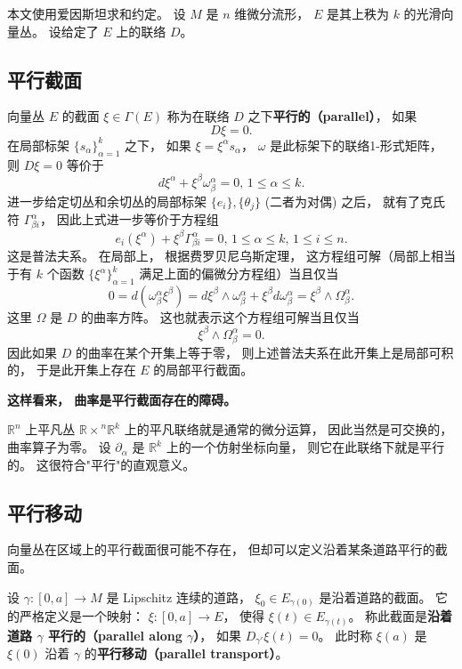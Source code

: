 

本文使用爱因斯坦求和约定。 设 $M$ 是 $n$ 维微分流形， $E$ 是其上秩为 $k$ 的光滑向量丛。 设给定了 $E$ 上的联络 $D$。

\subsection{平行截面}

向量丛 $E$ 的截面 $\xi\in\Gamma(E)$ 称为在联络 $D$ 之下\textbf{平行的（parallel）}， 如果
$$D\xi=0.$$
在局部标架 $\{s_\alpha\}_{\alpha=1}^k$ 之下， 如果 $\xi=\xi^\alpha s_\alpha$， $\omega$ 是此标架下的联络1-形式矩阵， 则 $D\xi=0$ 等价于
$$
d\xi^\alpha+\xi^\beta\omega^\alpha_\beta=0,\,1\leq \alpha\leq k.
$$
进一步给定切丛和余切丛的局部标架 $\{e_i\},\{\theta_j\}$ (二者为对偶) 之后， 就有了克氏符 $\Gamma_{\beta i}^\alpha$， 因此上式进一步等价于方程组
$$
e_i(\xi^\alpha)+\xi^\beta\Gamma^\alpha_{\beta i}=0,\,1\leq \alpha\leq k,\,1\leq i\leq n.
$$
这是普法夫系。 在局部上， 根据费罗贝尼乌斯定理， 这方程组可解（局部上相当于有 $k$ 个函数 $\{\xi^\alpha\}_{\alpha=1}^k$ 满足上面的偏微分方程组）当且仅当
$$
0=d(\omega^\alpha_\beta\xi^\beta)=d\xi^\beta\wedge\omega^\alpha_\beta+\xi^\beta d\omega^\alpha_\beta=\xi^\beta\wedge\Omega_\beta^\alpha.
$$
这里 $\Omega$ 是 $D$ 的曲率方阵。 这也就表示这个方程组可解当且仅当
$$
\xi^\beta\wedge\Omega_\beta^\alpha=0.
$$
因此如果 $D$ 的曲率在某个开集上等于零， 则上述普法夫系在此开集上是局部可积的， 于是此开集上存在 $E$ 的局部平行截面。

\textbf{这样看来， 曲率是平行截面存在的障碍。}

$\mathbb{R}^n$ 上平凡丛 $\mathbb{R\times}^n\mathbb{R}^k$ 上的平凡联络就是通常的微分运算， 因此当然是可交换的， 曲率算子为零。 设 $\partial_\alpha$ 是 $\mathbb{R}^k$ 上的一个仿射坐标向量， 则它在此联络下就是平行的。 这很符合"平行"的直观意义。 

\subsection{平行移动}
向量丛在区域上的平行截面很可能不存在， 但却可以定义沿着某条道路平行的截面。 

设 $\gamma:[0,a]\to M$ 是 Lipschitz 连续的道路， $\xi_0\in E_{\gamma(0)}$ 是沿着道路的截面。 它的严格定义是一个映射： $\xi:[0,a]\to E$， 使得 $\xi(t)\in E_{\gamma(t)}$。 称此截面是\textbf{沿着道路 $\gamma$ 平行的（parallel along $\gamma$）}， 如果 $D_{\gamma'}\xi(t)=0$。 此时称 $\xi(a)$ 是 $\xi(0)$ 沿着 $\gamma$ 的\textbf{平行移动（parallel transport）}。

